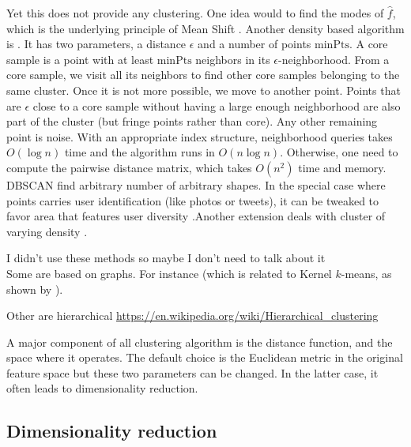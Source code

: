 Yet this does not provide any clustering. One idea would to find the modes of $\hat{f}$, which is the underlying principle of Mean Shift \autocite{MeanShift95}. Another density based algorithm is  \autocite{DBSCAN96}. It has two parameters, a distance $\epsilon$ and a number of points $\mathrm{minPts}$. A core sample is a point with at least $\mathrm{minPts}$ neighbors in its $\epsilon$-neighborhood. From a core sample, we visit all its neighbors to find other core samples belonging to the same cluster. Once it is not more possible, we move to another point. Points that are $\epsilon$ close to a core sample without having a large enough neighborhood are also part of the cluster (but fringe points rather than core). Any other remaining point is noise. With an appropriate index structure, neighborhood queries takes $O(\log n)$ time and the algorithm runs in $O(n\log n)$. Otherwise, one need to compute the pairwise distance matrix, which takes $O(n^2)$ time and memory. DBSCAN find arbitrary number of arbitrary shapes. In the special case where points carries user identification (like photos or tweets), it can be tweaked to favor area that features user diversity \autocite{PDBSCANKisilevich2010}.Another extension deals with cluster of varying density \autocite{OPTICS99}.

\begin{comments}
I didn't use these methods so maybe I don't need to talk about it\\
Some are based on graphs. For instance  \autocite{SpectralClustering01} (which is related to Kernel $k$-means, as shown by \textcite{KernelKmeans04}).
 \autocite{AffinityPropagation07}

Other are hierarchical
\url{https://en.wikipedia.org/wiki/Hierarchical_clustering}
\end{comments}

A major component of all clustering algorithm is the distance function, and the space where it operates. The default choice is the Euclidean metric in the original feature space but these two parameters can be changed. In the latter case, it often leads to dimensionality reduction.

\subsection{Dimensionality reduction}

